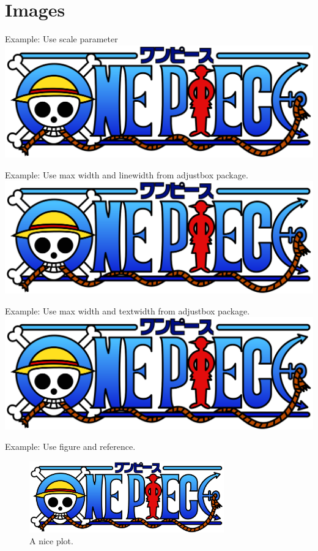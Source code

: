 \documentclass[letterpaper, oneside]{book}
\begin{document}
	\chapter{Images}
	Example: Use scale parameter \\
	\includegraphics[scale=0.6]{One_Piece_Logo.png}

	Example: Use max width and linewidth from adjustbox package. \\
	\includegraphics[max width=\linewidth]{One_Piece_Logo.png}

	Example: Use max width and textwidth from adjustbox package. \\
	\includegraphics[max width=\textwidth]{One_Piece_Logo.png}

	Example: Use figure and reference.
	\begin{figure}[h]
		\centering
		\includegraphics[width=0.75\textwidth]{One_Piece_Logo.png}
		\caption{A nice plot.}
		\label{fig:mesh1}
	\end{figure}
\end{document}

